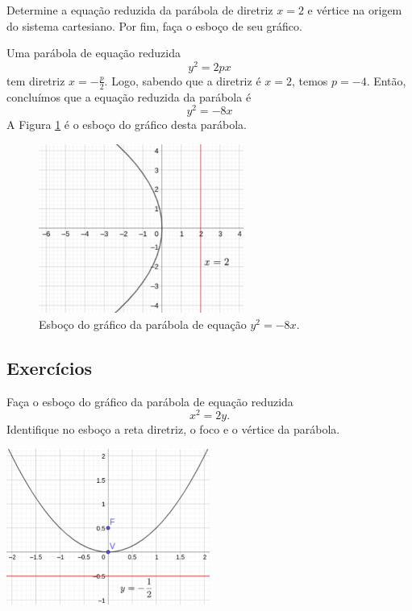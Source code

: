 \begin{exeresol}
  Determine a equação reduzida da parábola de diretriz $x=2$ e vértice na origem do sistema cartesiano. Por fim, faça o esboço de seu gráfico.
\end{exeresol}
\begin{resol}
  Uma parábola de equação reduzida
  \begin{equation}
    y^2 = 2px
  \end{equation}
  tem diretriz $\displaystyle x=-\frac{p}{2}$. Logo, sabendo que a diretriz é $x=2$, temos $p = -4$. Então, concluímos que a equação reduzida da parábola é
  \begin{equation}
    y^2 = -8x
  \end{equation}
  A Figura \ref{fig:parabola_exeresol_xp} é o esboço do gráfico desta parábola.

  \begin{figure}[H]
    \centering
    \includegraphics[width=0.6\textwidth]{cap_conicas/dados/fig_parabola_exeresol_xp/fig}
    \caption{Esboço do gráfico da parábola de equação $y^2 = -8x$.}
    \label{fig:parabola_exeresol_xp}
  \end{figure}  
\end{resol}

\subsection*{Exercícios}

\begin{exer}
  Faça o esboço do gráfico da parábola de equação reduzida
  \begin{equation}
    x^2 = 2y.
  \end{equation}
  Identifique no esboço a reta diretriz, o foco e o vértice da parábola.
\end{exer}
\begin{resp}
  \includegraphics[width=0.5\textwidth]{cap_conicas/dados/fig_parabola_exer_x2_2y/fig}
\end{resp}

